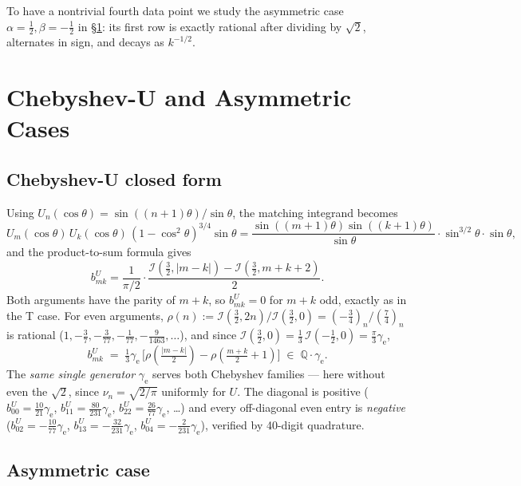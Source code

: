 \documentclass[11pt,a4paper]{article}
\begin{document}
To have a nontrivial fourth data point we study the asymmetric case
$\alpha=\tfrac12,\beta=-\tfrac12$ in \S\ref{sec:UandAsym}: its first row is
exactly rational after dividing by $\sqrt2$, alternates in sign, and decays
as $k^{-1/2}$.

\section{Chebyshev-U and Asymmetric Cases}\label{sec:UandAsym}

\subsection{Chebyshev-U closed form}

Using $U_n(\cos\theta)=\sin((n+1)\theta)/\sin\theta$, the matching integrand becomes
\[
  U_m(\cos\theta)\,U_k(\cos\theta)\,(1-\cos^2\theta)^{3/4}\sin\theta
  = \frac{\sin((m+1)\theta)\sin((k+1)\theta)}{\sin\theta}\cdot\sin^{3/2}\theta\cdot\sin\theta,
\]
and the product-to-sum formula gives
\[
  b_{mk}^U = \frac{1}{\pi/2}\cdot\frac{\mathcal{I}(\tfrac32,|m-k|)-\mathcal{I}(\tfrac32,m+k+2)}{2}.
\]
Both arguments have the parity of $m+k$, so $b_{mk}^U=0$ for $m+k$ odd,
exactly as in the T case.  For even arguments,
$\rho(n):=\mathcal{I}(\tfrac32,2n)/\mathcal{I}(\tfrac32,0)
=(-\tfrac34)_n/(\tfrac74)_n$ is rational ($1,-\tfrac37,-\tfrac{3}{77},
-\tfrac{1}{77},-\tfrac{9}{1463},\ldots$), and since
$\mathcal{I}(\tfrac32,0)=\tfrac13\,\mathcal{I}(-\tfrac12,0)=\tfrac\pi3\gamma_\mathrm{e}$,
\[
  b_{mk}^U \;=\; \tfrac13\gamma_\mathrm{e}\,
  \bigl[\rho(\tfrac{|m-k|}{2})-\rho(\tfrac{m+k}{2}+1)\bigr]
  \;\in\;\mathbb{Q}\cdot\gamma_\mathrm{e}.
\]
The \emph{same single generator} $\gamma_\mathrm{e}$ serves both Chebyshev
families --- here without even the $\sqrt2$, since $\nu_n=\sqrt{2/\pi}$ uniformly
for $U$.  The diagonal is positive
($b_{00}^U=\tfrac{10}{21}\gamma_\mathrm{e}$,
$b_{11}^U=\tfrac{80}{231}\gamma_\mathrm{e}$,
$b_{22}^U=\tfrac{26}{77}\gamma_\mathrm{e}$, \ldots) and every off-diagonal
even entry is \emph{negative}
($b_{02}^U=-\tfrac{10}{77}\gamma_\mathrm{e}$,
$b_{13}^U=-\tfrac{32}{231}\gamma_\mathrm{e}$,
$b_{04}^U=-\tfrac{2}{231}\gamma_\mathrm{e}$), verified by 40-digit quadrature.

\subsection{Asymmetric case}
\end{document}
